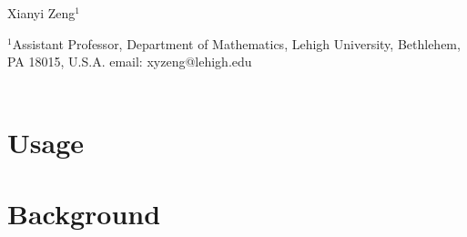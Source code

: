 \documentclass[12pt,letterpaper]{article}
\begin{document}
\normalsize
\begin{center}
Xianyi Zeng$^1$\\
\end{center}
$^1$Assistant Professor, Department of Mathematics, Lehigh University, Bethlehem, PA 18015, U.S.A. email: xyzeng@lehigh.edu\\
\\
\setcounter{tocdepth}{3}
\tableofcontents


\section{Usage}
\label{sec:use}


\section{Background}
\label{sec:bg}

\end{document}
